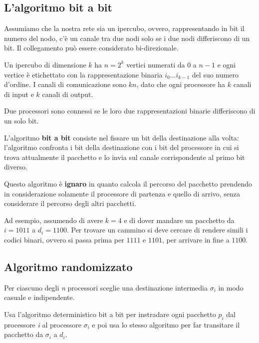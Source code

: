 
\subsection{L'algoritmo bit a bit}

Assumiamo che la nostra rete sia un ipercubo, ovvero, rappresentando in bit il numero del nodo, c'è un canale tra due nodi solo se i due nodi differiscono di un bit. Il collegamento può essere considerato bi-direzionale.

Un ipercubo di dimensione $k$ ha $n=2^k$ vertici numerati da 0 a $n-1$ e ogni vertice è etichettato con la rappresentazione binaria $i_0 \ldots i_{k-1}$ del suo numero d'ordine.
I canali di comunicazione sono $kn$, dato che ogni processore ha $k$ canali di input e $k$ canali di output.

Due processori sono connessi se le loro due rappresentazioni binarie differiscono di un solo bit.

L'algoritmo \textbf{bit a bit} consiste nel fissare un bit della destinazione alla volta: l'algoritmo confronta i bit della destinazione con i bit del processore in cui si trova attualmente il pacchetto e lo invia sul canale corrispondente al primo bit diverso.

Questo algoritmo è \textbf{ignaro} in quanto calcola il percorso del pacchetto prendendo in considerazione solamente il processore di partenza e quello di arrivo, senza considerare il percorso degli altri pacchetti.

Ad esempio, assumendo di avere $k=4$ e di dover mandare un pacchetto da $i = 1011$ a $d_i = 1100$. Per trovare un cammino si deve cercare di rendere simili i codici binari, ovvero si passa prima per $1111$ e $1101$, per arrivare in fine a $1100$.

\subsection{Algoritmo randomizzato}\label{una-prima-versione-dellalgoritmo-randomizzato}

Per ciascuno degli \emph{n} processori sceglie una destinazione intermedia $\sigma_i$ in modo casuale e indipendente.

Usa l'algoritmo deterministico bit a bit per instradare ogni pacchetto $p_i$ dal processore \emph{i} al processore $\sigma_i$ e poi usa lo
stesso algoritmo per far transitare il pacchetto da $\sigma_i$ a $d_i$.

